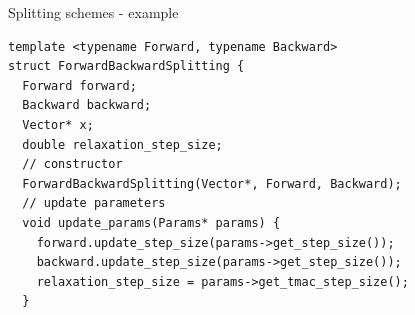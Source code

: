 \documentclass[hyperref,handout,compress,9pt,mathserif]{beamer}
\begin{document}
\begin{frame}[fragile]{Splitting schemes - example}
\begin{small}
\begin{lstlisting}
template <typename Forward, typename Backward>                                                                                                                                       
struct ForwardBackwardSplitting {                                                                                                                                                    
  Forward forward;                                                                                                                                                                   
  Backward backward;                                                                                                                                                                 
  Vector* x;                                                                                                                                                                         
  double relaxation_step_size;                                                                                                                                                       
  // constructor                                                                                                                                                                                   
  ForwardBackwardSplitting(Vector*, Forward, Backward);
  // update parameters                                                                                                                                                                                   
  void update_params(Params* params) {                                                                                                                                               
    forward.update_step_size(params->get_step_size());                                                                                                                               
    backward.update_step_size(params->get_step_size());                                                                                                                              
    relaxation_step_size = params->get_tmac_step_size();                                                                                                                            
  }                                                                                                                                                                                  

\end{lstlisting}
\end{small}
\end{frame}
\end{document}
